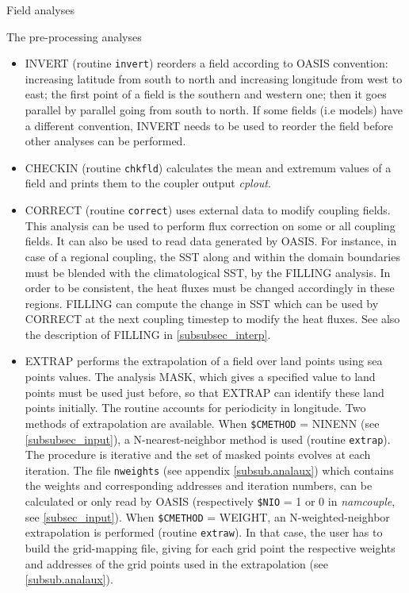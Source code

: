 \begin{subsection}{Field analyses}
\begin{subsubsection}{The pre-processing analyses}
\begin{itemize}
\item INVERT (routine {\tt invert}) reorders a field according to OASIS
convention: increasing latitude from south to north and increasing longitude
from west to east; the first point of a field is the southern
and western one; then it goes parallel by parallel going from south to
north. If some fields (i.e models) have a
different convention, INVERT needs to be used to reorder the field
before other analyses can be performed.

\item CHECKIN (routine {\tt chkfld}) calculates the mean and extremum
values of a field and prints them to the coupler output {\em cplout}.

\item CORRECT (routine {\tt correct}) uses external data to modify coupling
fields. This analysis can be used to perform flux correction
on some or all coupling fields. It can also be used to read data 
generated by OASIS. For instance,
in case of a regional coupling, the SST along and within the domain 
boundaries must be blended with the climatological SST, by the FILLING
analysis. In order to be consistent, the heat fluxes must be changed 
accordingly in these regions. FILLING can compute the change in SST
which can be used by CORRECT at the next coupling timestep to modify
the heat fluxes. See also the description of FILLING in 
\ref{subsubsec_interp}. 

\item EXTRAP performs the extrapolation of a field over land points 
using sea points values. The analysis
MASK, which gives a specified value to land points must be used
just before, so that EXTRAP can identify these land points
initially. The routine accounts for periodicity in longitude. Two methods of 
extrapolation are available. When {\tt \$CMETHOD} = NINENN (see 
\ref{subsubsec_input}), a N-nearest-neighbor method is used (routine 
{\tt extrap}). The procedure is iterative and the set of masked 
points evolves at each iteration. The file {\tt nweights} (see appendix
\ref{subsub.analaux}) which contains the weights and corresponding
addresses and iteration numbers, can be calculated or only read by
OASIS (respectively {\tt \$NIO} = 1 or 0 in {\em namcouple}, see 
\ref{subsec_input}). When
{\tt \$CMETHOD} = WEIGHT, an N-weighted-neighbor extrapolation is performed
(routine {\tt extraw}). In that case, the user has to build the
grid-mapping file, giving for each grid point the respective 
weights and addresses of the grid points used in the extrapolation 
(see \ref{subsub.analaux}).


\end{itemize}
\end{subsubsection}
\end{subsection}
